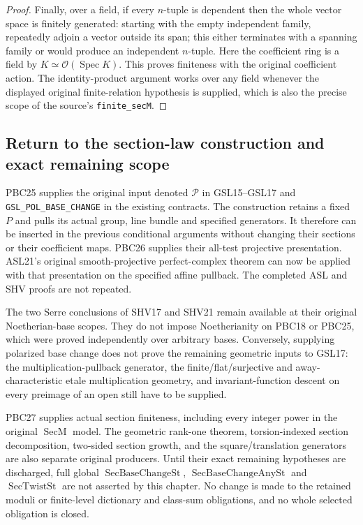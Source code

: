 \begin{proof}
Finally, over a field, if every $n$-tuple is dependent then
the whole vector space is finitely generated: starting with
the empty independent family, repeatedly adjoin a vector
outside its span; this either terminates with a spanning
family or would produce an independent $n$-tuple.
Here the coefficient ring is a field by
$K\simeq\mathcal O(\operatorname{Spec}K)$.
This proves finiteness with the original coefficient action.
The identity-product argument works over any field whenever
the displayed original finite-relation hypothesis is supplied,
which is also the precise scope of the source's
\texttt{finite\_secM}.
\end{proof}

\subsection{Return to the section-law construction and exact remaining scope}

PBC25 supplies the original input denoted $\mathcal P$ in GSL15--GSL17
and \texttt{GSL\_POL\_BASE\_CHANGE} in the existing contracts.
The construction retains a fixed $P$ and pulls its actual group,
line bundle and specified generators.  It therefore can be inserted
in the previous conditional arguments without changing their sections
or their coefficient maps.
PBC26 supplies their all-test projective presentation.
ASL21's original smooth-projective perfect-complex theorem can now
be applied with that presentation on the specified affine pullback.
The completed ASL and SHV proofs are not repeated.

The two Serre conclusions of SHV17 and SHV21 remain available at their
original Noetherian-base scopes.  They do not impose Noetherianity on
PBC18 or PBC25, which were proved independently over arbitrary bases.
Conversely, supplying polarized base change does not prove the
remaining geometric inputs to GSL17: the multiplication-pullback
generator, the finite/flat/surjective and away-characteristic etale
multiplication geometry, and invariant-function descent on every
preimage of an open still have to be supplied.

PBC27 supplies actual section finiteness, including every integer
power in the original $\operatorname{SecM}$ model.
The geometric rank-one theorem, torsion-indexed section decomposition,
two-sided section growth, and the square/translation generators are also
separate original producers.  Until their exact remaining hypotheses
are discharged, full global
$\operatorname{SecBaseChangeSt}$,
$\operatorname{SecBaseChangeAnySt}$ and
$\operatorname{SecTwistSt}$ are not asserted by this chapter.
No change is made to the retained moduli or finite-level dictionary
and class-sum obligations, and no whole selected obligation is closed.

